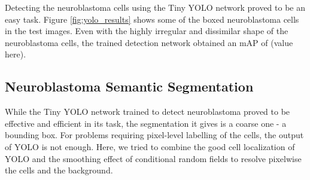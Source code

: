 \documentclass[journal]{IEEEtran}
\begin{document}
Detecting the neuroblastoma cells using the Tiny YOLO network proved to be an easy task. Figure \ref{fig:yolo_results} shows some of the boxed neuroblastoma cells in the test images.
Even with the highly irregular and dissimilar shape of the neuroblastoma cells, the trained detection network obtained an mAP of (value here).
\subsection{Neuroblastoma Semantic Segmentation}
While the Tiny YOLO network trained to detect neuroblastoma proved to be effective and efficient in its task, the segmentation it gives is a coarse one - a bounding box. For problems requiring pixel-level labelling of the cells, the output of YOLO is not enough. Here, we tried to combine the good cell localization of YOLO and the smoothing effect of conditional random fields to resolve pixelwise the cells and the background.
\end{document}
